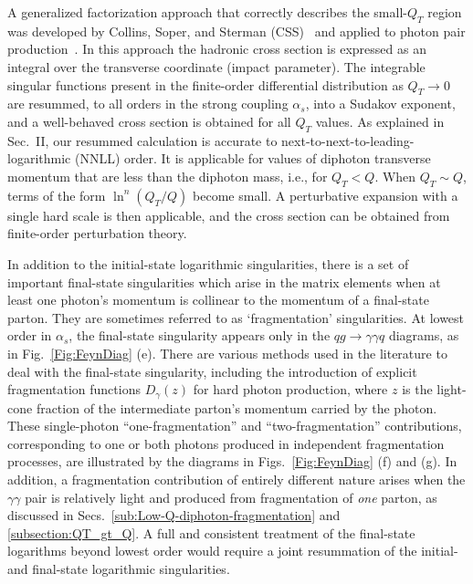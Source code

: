 \documentclass[12pt,english,aps,preprint,prd,letterpaper,fleqn,nofootinbib,showpacs,showkeys,tightenlines,floatfix]{revtex4}
\begin{document}
A generalized factorization approach that correctly describes the
small-$Q_{T}$ region was developed by Collins, Soper, and Sterman
(CSS)~\cite{Collins:1984kg} and applied to photon pair production~\cite{Balazs:1997hv,Balazs:1999yf,Nadolsky:2002gj}.
In this approach the hadronic cross section is expressed as an integral
over the transverse coordinate (impact parameter). The integrable singular functions present
in the finite-order differential distribution as $Q_{T}\rightarrow0$
are resummed, to all orders in the strong coupling $\alpha_{s}$,
into a Sudakov exponent, and a well-behaved cross section is obtained
for all $Q_{T}$ values. As explained in Sec.~II, our resummed calculation
is accurate to next-to-next-to-leading-logarithmic (NNLL) order. It
is applicable for values of diphoton transverse momentum that are less 
than the diphoton mass, i.e., for $Q_{T}<Q$.
When $Q_{T}\sim Q$, terms of the form $\ln^{n}(Q_{T}/Q)$ become
 small. A perturbative expansion with a single hard scale is then
applicable, and the cross section can be obtained from finite-order
perturbation theory.

In addition to the initial-state logarithmic singularities,
there is a set of important final-state singularities which arise
in the matrix elements when at least one photon's momentum is collinear
to the momentum of a final-state parton. They are sometimes referred
to as `fragmentation' singularities. At lowest order in $\alpha_{s}$,
the final-state singularity appears only in the $qg\rightarrow\gamma\gamma q$
diagrams, as in Fig.~\ref{Fig:FeynDiag} (e). There are various methods
used in the literature to deal with the final-state singularity, including
the introduction of explicit fragmentation functions $D_{\gamma}(z)$
for hard photon production, where $z$ is the light-cone fraction
of the intermediate parton's momentum carried by the photon. These
single-photon ``one-fragmentation'' and ``two-fragmentation'' 
contributions, corresponding to one or both photons produced
in independent fragmentation processes, are illustrated
by the diagrams in Figs.~\ref{Fig:FeynDiag} (f) and (g). In addition,
a fragmentation contribution of entirely different nature arises when
the $\gamma\gamma$ pair is relatively light and produced from
fragmentation of {\it one} parton, as discussed in
Secs.~\ref{sub:Low-Q-diphoton-fragmentation} and \ref{subsection:QT_gt_Q}.
A full and consistent treatment of the final-state logarithms beyond
lowest order would require a joint resummation of the initial- and
final-state logarithmic singularities. 
\end{document}
